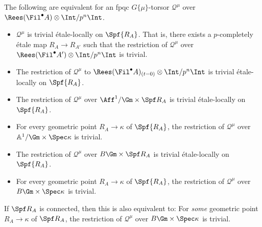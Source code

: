 \documentclass[10pt]{amsart}
\begin{document}
\begin{proposition}
\label{prop:fpqc_is_etale}
The following are equivalent for an fpqc $G\{\mu\}$-torsor $\mathcal{Q}^\mu$ over $\Rees(\Fil^\bullet A)\otimes\Int/p^n\Int$.
\begin{itemize}
   \item[(1)]$\mathcal{Q}^\mu$ is trivial \'etale-locally on $\Spf {R_A}$. That is, there exists a $p$-completely \'etale map ${R_A}\to {R_{A'}}$ such that the restriction of $\mathcal{Q}^\mu$ over $\Rees(\Fil^\bullet A')\otimes\Int/p^n\Int$ is trivial.
   \item[(2)]The restriction of $\mathcal{Q}^\mu$ to $\Rees(\Fil^\bullet A)_{(t=0)}\otimes\Int/p^n\Int$ is trivial \'etale-locally on $\Spf {R_A}$.
   \item[(3a)]The restriction of $\mathcal{Q}^\mu$ over $\Aff^1/\Gm\times \Spf R_A$ is trivial \'etale-locally on $\Spf {R_A}$.
   \item[(3b)]For every geometric point ${R_A}\to \kappa$ of $\Spf {R_A}$, the restriction of $\mathcal{Q}^\mu$ over $\mathbb{A}^1/\Gm\times\Spec \kappa$ is trivial.
   \item[(4a)]The restriction of $\mathcal{Q}^\mu$ over $B\Gm\times \Spf R_A$ is trivial \'etale-locally on $\Spf {R_A}$.
   \item[(4b)]For every geometric point ${R_A}\to \kappa$ of $\Spf {R_A}$, the restriction of $\mathcal{Q}^\mu$ over $B\Gm\times\Spec \kappa$ is trivial.
\end{itemize}
If $\Spf R_A$ is connected, then this is also equivalent to: For \emph{some} geometric point $R_A\to \kappa$ of $\Spf R_A$, the restriction of $\mathcal{Q}^\mu$ over $B\Gm\times \Spec \kappa$ is trivial.
\end{proposition} 
\end{document}
